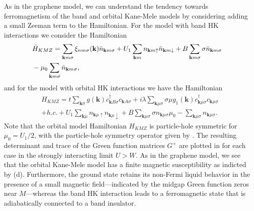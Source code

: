 \documentclass[prb,aps,amssymb,twocolumn,notitlepage]{revtex4-2}
\begin{document}
As in the graphene model, we can understand the tendency towards ferromagnetism of the band and orbital Kane-Mele models by considering adding a small Zeeman term to the Hamiltonian. 
For the model with band HK interactions we consider the Hamiltonian
\begin{align}
&\Bar{H}_{KMZ}=\sum_{\mathbf{k}m\sigma}\xi_{nm\sigma}(\mathbf{k})\Bar{n}_{\mathbf{k}m\sigma}+U_{1}\sum_{\mathbf{k}m}n_{\mathbf{k}m\uparrow}\Bar{n}_{\mathbf{k}m\downarrow} +B\sum_{\mathbf{k}m\sigma}\sigma \Bar{n}_{\mathbf{k}m\sigma} \nonumber \\
&-\mu_{0}\sum_{\mathbf{k}m\sigma}\Bar{n}_{\mathbf{k}m\sigma} ,
\end{align}
and for the model with orbital HK interactions we have the Hamiltonian
\begin{align}
&H_{KMZ}=t\sum_{\mathbf{k}\sigma}g(\mathbf{k})c^\dagger_{\mathbf{k}B\sigma}c_{\mathbf{k}A\sigma}+i\lambda\sum_{\mathbf{k}\mu\sigma}\sigma\mu g_{1}(\mathbf{k})c^\dagger_{\mathbf{k}\mu\sigma}c_{\mathbf{k}\mu\sigma}\nonumber \\
&+h.c.+U_{1}\sum_{\mathbf{k}\mu}n_{\mathbf{k}\mu\uparrow}n_{\mathbf{k}\mu\downarrow}+B\sum_{\mathbf{k}\mu\sigma}\sigma n_{\mathbf{k}\mu\sigma}\mu_{0}-\sum_{\mathbf{k}\mu\sigma}n_{\mathbf{k}\mu\sigma}.
\end{align}
Note that the orbital model Hamiltonian $H_{KMZ}$ is particle-hole symmetric for $\mu_0=U_1/2$, with the particle-hole symmetry operator given by . 
The resulting determinant and trace of the Green function matrices $G^{+}$ are plotted in  for each case in the strongly interacting limit $U>W$. 
As in the graphene model, we see that the orbital Kane-Mele model has a finite magnetic susceptibility as indicted by (d). 
Furthermore, the ground state retains its non-Fermi liquid behavior in the presence of a small magnetic field---indicated by the midgap Green function zeros near $M$---whereas the band HK interaction leads to a ferromagnetic state that is adiabatically connected to a band insulator. 
\end{document}
